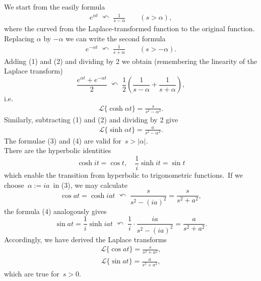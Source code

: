 \documentclass[12pt]{article}
\theoremstyle{definition}
\begin{document}
We start from the easily  formula
\begin{align}
e^{\alpha t} \;\curvearrowleft\; \frac{1}{s\!-\!\alpha} \qquad (s > \alpha),
\end{align}
where the curved  from the Laplace-transformed function to the original function.\, Replacing $\alpha$ by $-\alpha$ we can write the second formula
\begin{align}
e^{-\alpha t} \;\curvearrowleft\; \frac{1}{s\!+\!\alpha} \qquad (s > -\alpha).
\end{align}
Adding (1) and (2) and dividing by 2 we obtain (remembering the linearity of the Laplace transform)
$$\frac{e^{\alpha t}\!+\!e^{-\alpha t}}{2} \;\curvearrowleft\; 
\frac{1}{2}\!\left(\frac{1}{s\!-\!\alpha}\!+\!\frac{1}{s\!+\!\alpha}\right),$$
i.e.
\begin{align}
\mathcal{L}\{\cosh{\alpha t}\} = \frac{s}{s^2\!-\!\alpha^2}.
\end{align}
Similarly, subtracting (1) and (2) and dividing by 2 give
\begin{align}
\mathcal{L}\{\sinh{\alpha t}\} = \frac{a}{s^2\!-\!\alpha^2}.
\end{align}
The formulae (3) and (4) are valid for\, $s > |\alpha|$.\\


There are the hyperbolic identities
$$\cosh{it} = \cos{t}, \quad \frac{1}{i}\sinh{it} = \sin{t}$$
which enable the transition from hyperbolic to trigonometric functions.\, If we choose\, $\alpha := ia$\, in (3), we may calculate
$$\cos{at} = \cosh{iat} \;\curvearrowleft\; \frac{s}{s^2\!-\!(ia)^2} = \frac{s}{s^2+a^2},$$
the formula (4) analogously gives
$$\sin{at} = \frac{1}{i}\sinh{iat} \;\curvearrowleft\; \frac{1}{i}\!\cdot\!\frac{ia}{s^2\!-\!(ia)^2} = \frac{a}{s^2+a^2}.$$
Accordingly, we have derived the Laplace transforms
\begin{align}
\mathcal{L}\{\cos{at}\} = \frac{s}{s^2\!+\!a^2},
\end{align}
\begin{align}
\mathcal{L}\{\sin{at}\} = \frac{a}{s^2\!+\!a^2},
\end{align}
which are true for\, $s > 0$.

\end{document}
